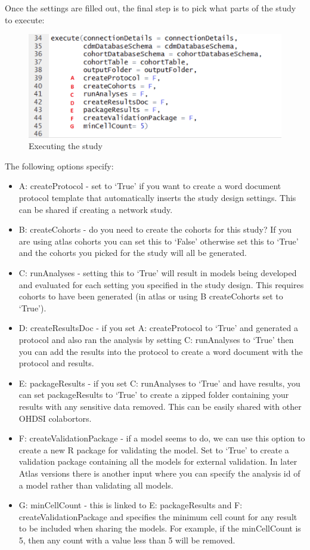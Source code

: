 \documentclass[11pt]{book}
\providecommand{\tightlist}{%
  \setlength{\itemsep}{0pt}\setlength{\parskip}{0pt}}
\theoremstyle{definition}
\theoremstyle{definition}
\theoremstyle{definition}
\theoremstyle{remark}
\begin{document}
Once the settings are filled out, the final step is to pick what parts of the study to execute:

\begin{figure}
\includegraphics[width=1\linewidth]{images/PatientLevelPrediction/atlasImplementation/execute} \caption{Executing the study}\label{fig:figureU20}
\end{figure}

The following options specify:

\begin{itemize}
\tightlist
\item
  A: createProtocol - set to `True' if you want to create a word document protocol template that automatically inserts the study design settings. This can be shared if creating a network study.
\item
  B: createCohorts - do you need to create the cohorts for this study? If you are using atlas cohorts you can set this to `False' otherwise set this to `True' and the cohorts you picked for the study will all be generated.
\item
  C: runAnalyses - setting this to `True' will result in models being developed and evaluated for each setting you specified in the study design. This requires cohorts to have been generated (in atlas or using B createCohorts set to `True').
\item
  D: createResultsDoc - if you set A: createProtocol to `True' and generated a protocol and also ran the analysis by setting C: runAnalyses to `True' then you can add the results into the protocol to create a word document with the protocol and results.
\item
  E: packageResults - if you set C: runAnalyses to `True' and have results, you can set packageResults to `True' to create a zipped folder containing your results with any sensitive data removed. This can be easily shared with other OHDSI colabortors.
\item
  F: createValidationPackage - if a model seems to do, we can use this option to create a new R package for validating the model. Set to `True' to create a validation package containing all the models for external validation. In later Atlas versions there is another input where you can specify the analysis id of a model rather than validating all models.
\item
  G: minCellCount - this is linked to E: packageResults and F: createValidationPackage and specifies the minimum cell count for any result to be included when sharing the models. For example, if the minCellCount is 5, then any count with a value less than 5 will be removed.
\end{itemize}
\end{document}
